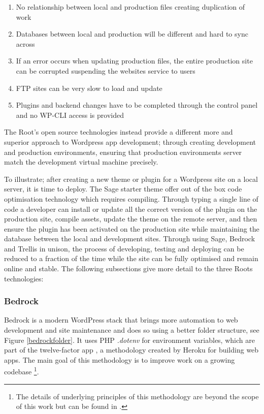 \documentclass[fontsize=11pt]{extarticle}
\numberwithin{figure}{section} %
\providecommand{\tightlist}{%
  \setlength{\itemsep}{0pt}\setlength{\parskip}{0pt}}
\begin{document}
\begin{enumerate}

\tightlist
\item
  No relationship between local and production files creating
  duplication of work
\item
  Databases between local and production will be different and hard to
  sync across
\item
  If an error occurs when updating production files, the entire
  production site can be corrupted suspending the websites service to
  users
\item
  FTP sites can be very slow to load and update
\item
  Plugins and backend changes have to be completed through the control
  panel and no WP-CLI access is provided \cite{p13}
\end{enumerate}

The Root's open source technologies instead provide a different more and
superior approach to Wordpress app development; through creating
development and production environments, ensuring that production
environments server match the development virtual machine precisely.

To illustrate; after creating a new theme or plugin for a Wordpress site
on a local server, it is time to deploy. The Sage starter theme offer
out of the box code optimisation technology which requires compiling.
Through typing a single line of code a developer can install or update
all the correct version of the plugin on the production site, compile
assets, update the theme on the remote server, and then ensure the
plugin has been activated on the production site while maintaining the
database between the local and development sites. Through using Sage,
Bedrock and Trellis in unison, the process of developing, testing and
deploying can be reduced to a fraction of the time while the site can be
fully optimised and remain online and stable. The following subsections
give more detail to the three Roots technologies:

\hypertarget{bedrock}{%
\subsubsection{Bedrock}\label{bedrock}}

Bedrock is a modern WordPress stack that brings more automation to web
development and site maintenance and does so using a better folder
structure, see Figure \ref{bedrockfolder}. It uses PHP \emph{.dotenv}
for environment variables, which are part of the twelve-factor app
\cite{p6}, a methodology created by Heroku for building web
apps\cite{p5}. The main goal of this methodology is to improve work on a
growing codebase
\footnote{The details of underlying principles of this methodology are beyond the scope of this work but can be found in \cite{p8}.}.
\end{document}
